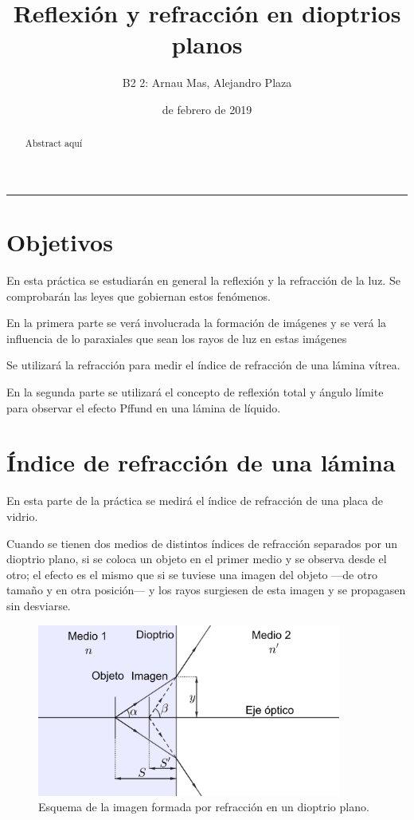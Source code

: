 \documentclass[12pt]{article}
\title{\sffamily {\bfseries Práctica 2:} Reflexión y refracción en dioptrios planos}
\author{\sffamily B2 2: Arnau Mas, Alejandro Plaza}
\date{\sffamily 28 de febrero de 2019}
\numberwithin{table}{section}
\numberwithin{figure}{section}
\numberwithin{equation}{section}
\begin{document}
\maketitle
\renewcommand{\abstractname}{\sffamily \bfseries Resumen:}
\begin{abstract}
	Abstract aquí
\end{abstract}
\hrule

\section{Objetivos}
En esta práctica se estudiarán en general la reflexión y la refracción de la luz. Se comprobarán las leyes que gobiernan estos fenómenos.

En la primera parte se verá involucrada la formación de imágenes y se verá la influencia de lo paraxiales que sean los rayos de luz en estas imágenes

Se utilizará la refracción para medir el índice de refracción de una lámina vítrea.

En la segunda parte se utilizará el concepto de reflexión total y ángulo límite para observar el efecto Pffund en una lámina de líquido.

\section{Índice de refracción de una lámina}
En esta parte de la práctica se medirá el índice de refracción de una placa de vidrio.

Cuando se tienen dos medios de distintos índices de refracción separados por un dioptrio plano, si se coloca un objeto en el primer medio y se observa desde el otro; el efecto es el mismo que si se tuviese una imagen del objeto ---de otro tamaño y en otra posición--- y los rayos surgiesen de esta imagen y se propagasen sin desviarse.

\begin{figure}[!ht]
	\small \centering \sffamily
	\begin{center}
		\includegraphics[width=10cm]{P2Refraccion.png}
		\caption{Esquema de la imagen formada por refracción en un dioptrio plano.}
		\label{P2refraccion}
	\end{center}
\end{figure}
\end{document}
